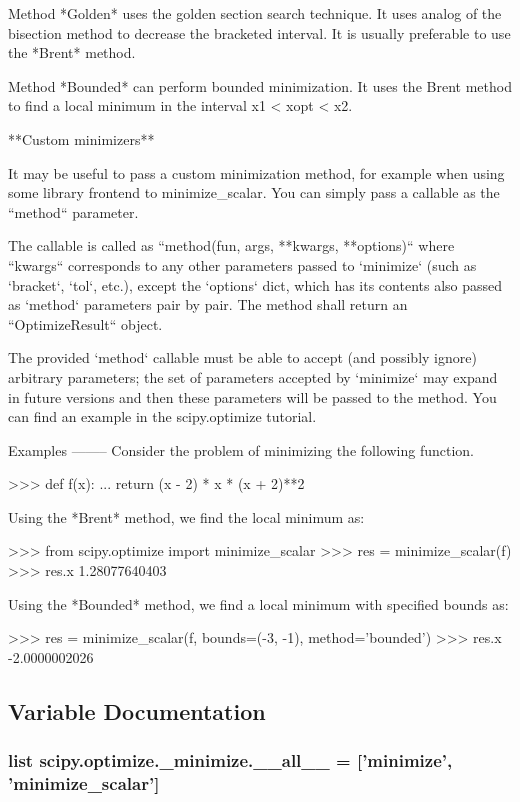 \begin{DoxyVerb}
Method *Golden* uses the golden section search technique. It uses
analog of the bisection method to decrease the bracketed interval. It
is usually preferable to use the *Brent* method.

Method *Bounded* can perform bounded minimization. It uses the Brent
method to find a local minimum in the interval x1 < xopt < x2.

**Custom minimizers**

It may be useful to pass a custom minimization method, for example
when using some library frontend to minimize_scalar.  You can simply
pass a callable as the ``method`` parameter.

The callable is called as ``method(fun, args, **kwargs, **options)``
where ``kwargs`` corresponds to any other parameters passed to `minimize`
(such as `bracket`, `tol`, etc.), except the `options` dict, which has
its contents also passed as `method` parameters pair by pair.  The method
shall return an ``OptimizeResult`` object.

The provided `method` callable must be able to accept (and possibly ignore)
arbitrary parameters; the set of parameters accepted by `minimize` may
expand in future versions and then these parameters will be passed to
the method.  You can find an example in the scipy.optimize tutorial.

Examples
--------
Consider the problem of minimizing the following function.

>>> def f(x):
...     return (x - 2) * x * (x + 2)**2

Using the *Brent* method, we find the local minimum as:

>>> from scipy.optimize import minimize_scalar
>>> res = minimize_scalar(f)
>>> res.x
1.28077640403

Using the *Bounded* method, we find a local minimum with specified
bounds as:

>>> res = minimize_scalar(f, bounds=(-3, -1), method='bounded')
>>> res.x
-2.0000002026\end{DoxyVerb}
 

\subsection{Variable Documentation}
\hypertarget{namespacescipy_1_1optimize_1_1__minimize_ad539d868b0fc31d21322a15a52e9652b}{}
\subsubsection[{\+\_\+\+\_\+all\+\_\+\+\_\+}]{\setlength{\rightskip}{0pt plus 5cm}list scipy.\+optimize.\+\_\+minimize.\+\_\+\+\_\+all\+\_\+\+\_\+ = \mbox{[}'{\bf minimize}', '{\bf minimize\+\_\+scalar}'\mbox{]}}\label{namespacescipy_1_1optimize_1_1__minimize_ad539d868b0fc31d21322a15a52e9652b}
